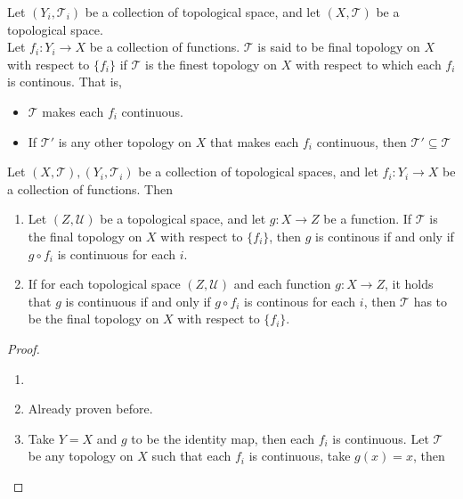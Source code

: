 \begin{definition}
    Let $(Y_i,\mathcal{T}_i)$ be a collection of topological space, and let $(X,\mathcal{T})$ be a topological space.\\
    Let $f_i:Y_i\to X$ be a collection of functions.
    $\mathcal{T}$ is said to be final topology on $X$ with respect to $\{f_i\}$ if $\mathcal{T}$ is the finest topology on $X$ with respect to which each $f_i$ is continous. That is,
\begin{itemize}
        \item $\mathcal{T}$ makes each $f_i$ continuous.
        \item If $\mathcal{T}'$ is any other topology on $X$ that makes each $f_i$ continuous, then $\mathcal{T}'\subseteq\mathcal{T}$
\end{itemize}
\end{definition}
\vspace{5mm}
\begin{theorem}
    Let $(X,\mathcal{T}), (Y_i,\mathcal{T}_i)$ be a collection of topological spaces, and let $f_i:Y_i\to X$ be a collection of functions. Then
    \begin{enumerate}
        \item Let $(Z,\mathcal{U})$ be a topological space, and let $g:X\to Z$ be a function. If $\mathcal{T}$ is the final topology on $X$ with respect to $\{f_i\}$, then $g$ is continous if and only if $g\circ f_i$ is continuous for each $i$.
        \item If for each topological space $(Z,\mathcal{U})$ and each function $g:X\to Z$, it holds that $g$ is continuous if and only if $g\circ f_i$ is continous for each $i$, then $\mathcal{T}$ has to be the final topology on $X$ with respect to $\{f_i\}$.
    \end{enumerate}
\end{theorem}
\begin{proof}
     \begin{enumerate}
         \item []
         \item Already proven before.
         \item Take $Y=X$ and $g$ to be the identity map, then each $f_{i}$ is continuous. Let $\mathcal{T}$ be any topology on $X$ such that each $f_{i}$ is continuous, take $g(x)=x$, then
     \end{enumerate}
     
\end{proof}
